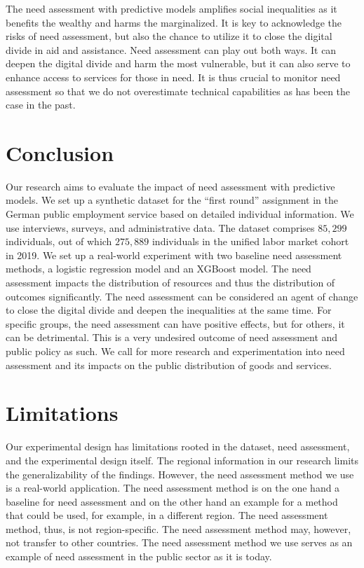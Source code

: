 \documentclass{article} %
\begin{document}
The need assessment with predictive models amplifies social inequalities as it benefits the wealthy and harms the marginalized. It is key to acknowledge the risks of need assessment, but also the chance to utilize it to close the digital divide in aid and assistance. Need assessment can play out both ways. It can deepen the digital divide and harm the most vulnerable, but it can also serve to enhance access to services for those in need. It is thus crucial to monitor need assessment so that we do not overestimate technical capabilities as has been the case in the past.







\section{Conclusion}

Our research aims to evaluate the impact of need assessment with predictive models. We set up a synthetic dataset for the ``first round'' assignment in the German public employment service based on detailed individual information. We use interviews, surveys, and administrative data. The dataset comprises $85{,}299$ individuals, out of which $275{,}889$ individuals in the unified labor market cohort in 2019. We set up a real-world experiment with two baseline need assessment methods, a logistic regression model and an XGBoost model. The need assessment impacts the distribution of resources and thus the distribution of outcomes significantly. The need assessment can be considered an agent of change to close the digital divide and deepen the inequalities at the same time. For specific groups, the need assessment can have positive effects, but for others, it can be detrimental. This is a very undesired outcome of need assessment and public policy as such. We call for more research and experimentation into need assessment and its impacts on the public distribution of goods and services. 


\section{Limitations}

\label{sec:limitations}
Our experimental design has limitations rooted in the dataset, need assessment, and the experimental design itself. The regional information in our research limits the generalizability of the findings. However, the need assessment method we use is a real-world application. The need assessment method is on the one hand a baseline for need assessment and on the other hand an example for a method that could be used, for example, in a different region. The need assessment method, thus, is not region-specific. The need assessment method may, however,  not transfer to other countries. The need assessment method we use serves as an example of need assessment in the public sector as it is today.
\end{document}
